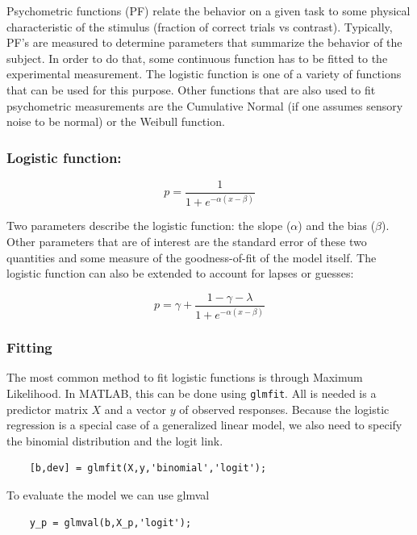 \documentclass[a4paper]{report}
\begin{document}
Psychometric functions (PF) relate the behavior on a given task to some physical characteristic of the stimulus (fraction of correct trials vs contrast). Typically, PF's are measured to determine parameters that summarize the behavior of the subject. In order to do that, some continuous function has to be fitted to the experimental measurement. The logistic function is one of a variety of functions that can be used for this purpose. Other functions that are also used to fit psychometric measurements are the Cumulative Normal (if one assumes sensory noise to be normal) or the Weibull function.

\subsubsection{Logistic function:}

\begin{equation*}
p=\frac{1}{1+e^{-\alpha(x-\beta)}}
\end{equation*}

Two parameters describe the logistic function: the slope ($\alpha$) and the bias ($\beta$). Other parameters that are of interest are the standard error of these two quantities and some measure of the goodness-of-fit of the model itself. The logistic function can also be extended to account for lapses or guesses:

\begin{equation*}
p=\gamma + \frac{1-\gamma-\lambda}{1+e^{-\alpha(x-\beta)}}
\end{equation*}


\subsubsection*{Fitting}

The most common method to fit logistic functions is through Maximum Likelihood. In MATLAB, this can be done using \texttt{glmfit}. All is needed is a predictor matrix $X$ and a vector $y$ of observed responses. Because the logistic regression is a special case of a generalized linear model, we also need to specify the binomial distribution and the logit link.

\begin{verbatim}
	[b,dev] = glmfit(X,y,'binomial','logit');
\end{verbatim}

To evaluate the model we can use glmval

\begin{verbatim}
	y_p = glmval(b,X_p,'logit');
\end{verbatim}
\end{document}
